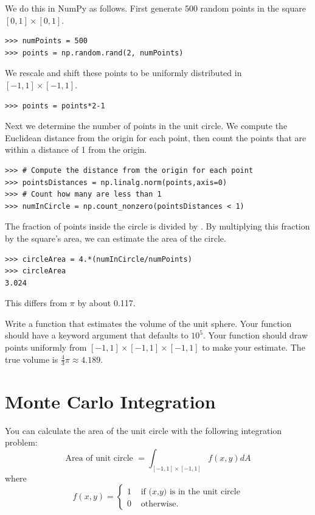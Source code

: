We do this in NumPy as follows. First generate 500 random points in the square $[0,1] \times [0,1]$.
\begin{lstlisting}
>>> numPoints = 500
>>> points = np.random.rand(2, numPoints)
\end{lstlisting}
We rescale and shift these points to be uniformly distributed in $[-1,1]\times[-1,1]$.
\begin{lstlisting}
>>> points = points*2-1
\end{lstlisting}
Next we determine the number of points in the unit circle.
We compute the Euclidean distance from the origin for each point, then count the points that are within a distance of 1 from the origin.
\begin{lstlisting}
>>> # Compute the distance from the origin for each point
>>> pointsDistances = np.linalg.norm(points,axis=0)
>>> # Count how many are less than 1
>>> numInCircle = np.count_nonzero(pointsDistances < 1)
\end{lstlisting}
The fraction of points inside the circle is  divided by . By multiplying this fraction by the square's area, we can estimate the area of the circle. 
\begin{lstlisting}
>>> circleArea = 4.*(numInCircle/numPoints)
>>> circleArea
3.024
\end{lstlisting}
This differs from $\pi$ by about 0.117.

\begin{problem}
\label{prob:sphere}
Write a function that estimates the volume of the unit sphere. Your function should have a keyword argument  that defaults to $10^5$. Your function should draw  points uniformly from $[-1,1]\times[-1,1]\times[-1,1]$ to make your estimate. The true volume is $\frac{4}{3}\pi \approx 4.189$.
\end{problem}

\section*{Monte Carlo Integration}

You can calculate the area of the unit circle with the following integration problem:
\[
\mbox{Area of unit circle } = \int_{[-1,1]\times[-1,1]} f(x,y) dA
\]
where
\begin{equation}\label{equ:mc_func}
f(x,y) = \begin{cases} 1 &\mbox{ if $(x$,$y)$ is in the unit circle} \\ 0 &\mbox{ otherwise.} \end{cases}
\end{equation}

